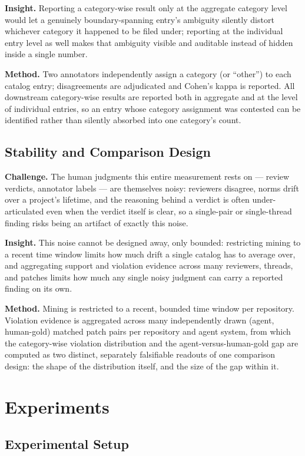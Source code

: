 \documentclass[11pt]{article}
\begin{document}
\textbf{Insight.} Reporting a category-wise result only at the aggregate category level would let a genuinely boundary-spanning entry's ambiguity silently distort whichever category it happened to be filed under; reporting at the individual entry level as well makes that ambiguity visible and auditable instead of hidden inside a single number.

\textbf{Method.} Two annotators independently assign a category (or ``other'') to each catalog entry; disagreements are adjudicated and Cohen's kappa is reported. All downstream category-wise results are reported both in aggregate and at the level of individual entries, so an entry whose category assignment was contested can be identified rather than silently absorbed into one category's count.

\subsection{Stability and Comparison Design}
\textbf{Challenge.} The human judgments this entire measurement rests on --- review verdicts, annotator labels --- are themselves noisy: reviewers disagree, norms drift over a project's lifetime, and the reasoning behind a verdict is often under-articulated even when the verdict itself is clear, so a single-pair or single-thread finding risks being an artifact of exactly this noise.

\textbf{Insight.} This noise cannot be designed away, only bounded: restricting mining to a recent time window limits how much drift a single catalog has to average over, and aggregating support and violation evidence across many reviewers, threads, and patches limits how much any single noisy judgment can carry a reported finding on its own.

\textbf{Method.} Mining is restricted to a recent, bounded time window per repository. Violation evidence is aggregated across many independently drawn (agent, human-gold) matched patch pairs per repository and agent system, from which the category-wise violation distribution and the agent-versus-human-gold gap are computed as two distinct, separately falsifiable readouts of one comparison design: the shape of the distribution itself, and the size of the gap within it.

\section{Experiments}

\subsection{Experimental Setup}
\end{document}
